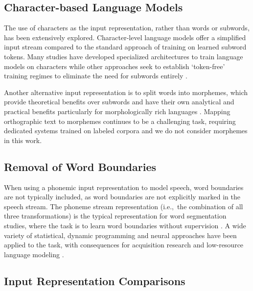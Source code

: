 \subsection{Character-based Language Models}

The use of characters as the input representation, rather than words or subwords, has been extensively explored. Character-level language models offer a simplified input stream compared to the standard approach of training on learned subword tokens. Many studies have developed specialized architectures to train language models on characters \citep{jozefowicz2016exploringlimitslanguagemodeling, kim2016character, ma-etal-2020-charbert, al-rfou_character-level_2019} while other approaches seek to establish `token-free' training regimes to eliminate the need for subwords entirely \citep{clark-etal-2022-canine, xue-2022-byt5}.

Another alternative input representation is to split words into morphemes, which provide theoretical benefits over subwords and have their own analytical and practical benefits particularly for morphologically rich languages \citep{ustun-etal-2018-characters, nzeyimana-niyongabo-rubungo-2022-kinyabert, fan-sun-2023-constructivist}. Mapping orthographic text to morphemes continues to be a challenging task, requiring dedicated systems trained on labeled corpora \citep{batsuren-etal-2022-sigmorphon} and we do not consider morphemes in this work.

\subsection{Removal of Word Boundaries}

When using a phonemic input representation to model speech, word boundaries are not typically included, as word boundaries are not explicitly marked in the speech stream. The phoneme stream representation (i.e.,\ the combination of all three transformations) is the typical representation for word segmentation studies, where the task is to learn word boundaries without supervision \citep{Brent1999}. A wide variety of statistical, dynamic programming and neural approaches have been applied to the task, with consequences for acquisition research and low-resource language modeling \citep{Blanchard2010, Coltekin2017, algayres_dp-parse_2022, goriely2023word}.

\subsection{Input Representation Comparisons}

